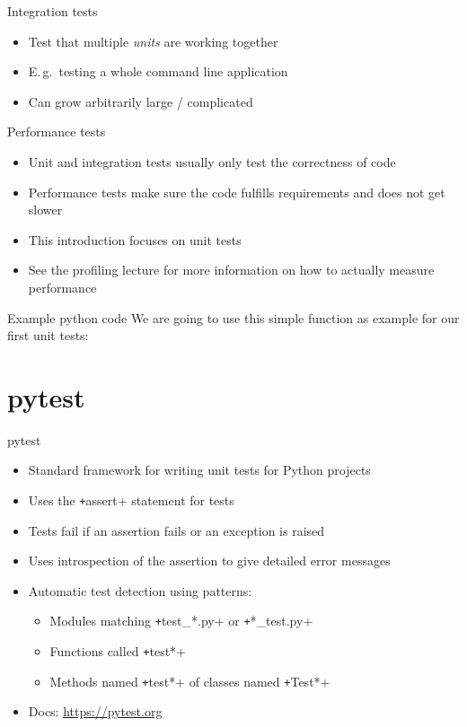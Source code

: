 \begin{frame}[c]{Integration tests}
  \begin{itemize}
    \item Test that multiple \emph{units} are working together
    \item E.\,g.\ testing a whole command line application
    \item Can grow arbitrarily large / complicated
  \end{itemize}
\end{frame}

\begin{frame}[c]{Performance tests}
  \begin{itemize}
    \item Unit and integration tests usually only test the correctness of code
    \item Performance tests make sure the code fulfills requirements and does not get slower
    \item This introduction focuses on unit tests
    \item See the profiling lecture for more information on how to actually measure performance
  \end{itemize}
\end{frame}

\begin{frame}[c, fragile]{Example python code}
  We are going to use this simple function as example for our first unit tests:
\end{frame}

\section{pytest}

\begin{frame}[c, fragile]{pytest}
  \begin{itemize}
    \item Standard framework for writing unit tests for Python projects
    \item Uses the \texttt+assert+ statement for tests
    \item Tests fail if an assertion fails or an exception is raised
    \item Uses introspection of the assertion to give detailed error messages
    \item Automatic test detection using patterns:
      \begin{itemize}
        \item Modules matching \texttt+test_*.py+ or \texttt+*_test.py+
        \item Functions called \texttt+test*+
        \item Methods named \texttt+test*+ of classes named \texttt+Test*+
      \end{itemize}

    \item Docs: \url{https://pytest.org}
  \end{itemize}

\end{frame}

